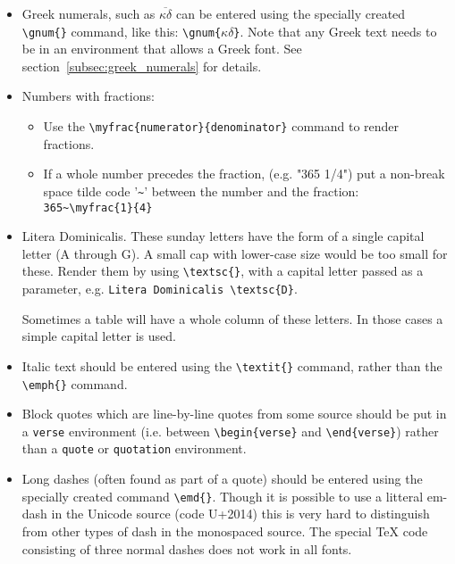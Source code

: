 \documentclass{report}
\begin{document}
\begin{itemize}
\item Greek numerals, such as $\overline{\kappa\delta}$ can be entered using
the specially created \verb+\gnum{}+ command,
like this: \verb+\gnum{+$\kappa\delta$\verb+}+.
Note that any Greek text needs to be in an environment that 
allows a Greek font.
See section~\ref{subsec:greek_numerals} for details.

\item Numbers with fractions:
\begin{itemize}
\item Use the \verb+\myfrac{numerator}{denominator}+ command to
 render fractions.
\item If a whole number precedes the fraction,
(e.g. "365 1/4")
put a non-break space tilde code '\verb+~+' between the number
and the fraction: \verb+365~\myfrac{1}{4}+ 
\end{itemize}

\item Litera Dominicalis. These sunday letters have the form of a single
capital letter (A through G).
A small cap with lower-case size would be too small for these.
Render them by using \verb+\textsc{}+,
with a capital letter passed as a parameter,
e.g. \verb+Litera Dominicalis \textsc{D}+.

Sometimes a table will have a whole column of these letters.
In those cases a simple capital letter is used.

\item Italic text should be entered using the \verb+\textit{}+ command,
rather than the \verb+\emph{}+ command.

\item Block quotes which are line-by-line quotes from some source should be
put in a \verb+verse+ environment
(i.e. between \verb+\begin{verse}+ and \verb+\end{verse}+)
rather than a \verb+quote+
or \verb+quotation+ environment.

\item Long dashes (often found as part of a quote) should be entered 
using the specially created command
\verb+\emd{}+.
Though it is possible to use a litteral em-dash in the Unicode source
(code U+2014) this is very hard to distinguish from other types of dash
in the monospaced source.
The special \TeX{} code consisting of three normal dashes does not work
in all fonts.

\end{itemize}
\end{document}
